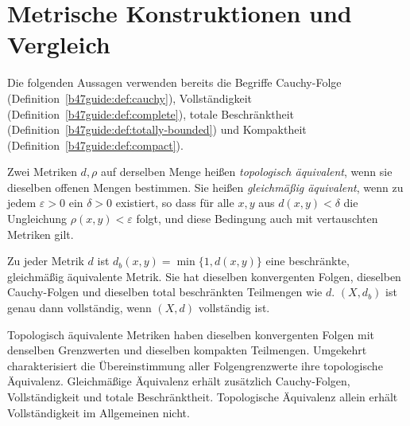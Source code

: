 \section{Metrische Konstruktionen und Vergleich}

Die folgenden Aussagen verwenden bereits die Begriffe Cauchy-Folge
(Definition~\ref{b47guide:def:cauchy}), Vollständigkeit
(Definition~\ref{b47guide:def:complete}), totale Beschränktheit
(Definition~\ref{b47guide:def:totally-bounded}) und Kompaktheit
(Definition~\ref{b47guide:def:compact}).

\begin{definition}
Zwei Metriken $d,\rho$ auf derselben Menge heißen \emph{topologisch
äquivalent}, wenn sie dieselben offenen Mengen bestimmen. Sie heißen
\emph{gleichmäßig äquivalent}, wenn zu jedem $\varepsilon>0$ ein $\delta>0$
existiert, so dass für alle $x,y$ aus $d(x,y)<\delta$ die Ungleichung
$\rho(x,y)<\varepsilon$ folgt, und diese Bedingung auch mit vertauschten
Metriken gilt.
\end{definition}

\begin{theorem}
\label{b47guide:thm:bounded-metric}
Zu jeder Metrik $d$ ist $d_b(x,y)=\min\{1,d(x,y)\}$ eine beschränkte,
gleichmäßig äquivalente Metrik. Sie hat dieselben konvergenten Folgen,
dieselben Cauchy-Folgen und dieselben total beschränkten Teilmengen wie $d$.
$(X,d_b)$ ist genau dann vollständig, wenn $(X,d)$ vollständig ist.
\end{theorem}

\begin{theorem}
Topologisch äquivalente Metriken haben dieselben konvergenten Folgen mit
denselben Grenzwerten und dieselben kompakten Teilmengen. Umgekehrt
charakterisiert die Übereinstimmung aller Folgengrenzwerte ihre topologische
Äquivalenz. Gleichmäßige Äquivalenz erhält zusätzlich Cauchy-Folgen,
Vollständigkeit und totale Beschränktheit. Topologische Äquivalenz allein
erhält Vollständigkeit im Allgemeinen nicht.
\end{theorem}


